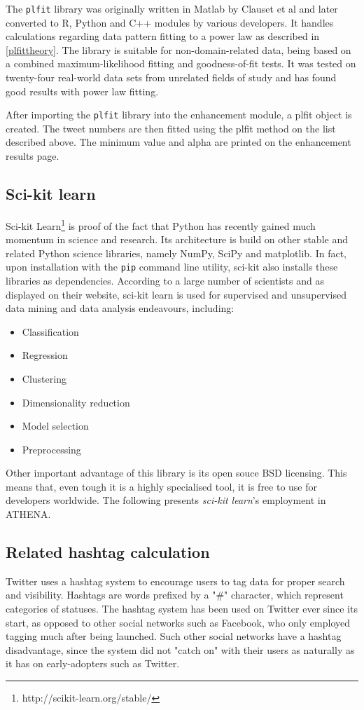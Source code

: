 The \texttt{plfit} library was originally written in Matlab by Clauset et al \cite{clauset2009power} and later converted to R, Python and C++ modules by various developers. It handles calculations regarding data pattern fitting to a power law as described in \ref{plfittheory}. The library is suitable for non-domain-related data, being based on a combined maximum-likelihood fitting and goodness-of-fit tests. It was tested on twenty-four real-world data sets from unrelated fields of study and has found good results with power law fitting.

After importing the \texttt{plfit} library into the enhancement module, a plfit object is created. The tweet numbers are then fitted using the plfit method on the list described above. The minimum value and alpha are printed on the enhancement results page.

\subsection{Sci-kit learn}
Sci-kit Learn\footnote{http://scikit-learn.org/stable/} is proof of the fact that Python has recently gained much momentum in science and research. Its architecture is build on other stable and related Python science libraries, namely NumPy, SciPy and matplotlib. In fact, upon installation with the \texttt{pip} command line utility, sci-kit also installs these libraries as dependencies. According to a large number of scientists \cite{pedregosa2011scikit} and as displayed on their website, sci-kit learn is used for supervised and unsupervised data mining and data analysis endeavours, including:

\begin{itemize}
\item Classification
\item Regression
\item Clustering
\item Dimensionality reduction
\item Model selection
\item Preprocessing
\end{itemize}

Other important advantage of this library is its open souce BSD licensing. This means that, even tough it is a highly specialised tool, it is free to use for developers worldwide. The following presents \emph{sci-kit learn}'s employment in ATHENA.

\subsection{Related hashtag calculation}
Twitter uses a hashtag system to encourage users to tag data for proper search and visibility. Hashtags are words prefixed by a "\#" character, which represent categories of statuses. The hashtag system has been used on Twitter ever since its start, as opposed to other social networks such as Facebook, who only employed tagging much after being launched. Such other social networks have a hashtag disadvantage, since the system did not "catch on" with their users as naturally as it has on early-adopters such as Twitter.

